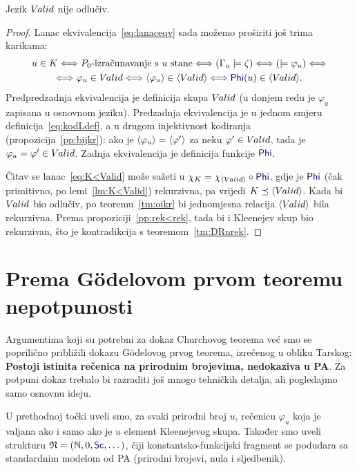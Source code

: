 \begin{propozicija}
Jezik $V\mspace{-1.5mu}alid$ nije odlučiv.
\end{propozicija}
\begin{proof}
Lanac ekvivalencija~\eqref{eq:lanaceqv} sada možemo proširiti još trima karikama:
\begin{multline}\label{eq:K<Valid}
    u\in K
    \Longleftrightarrow
    \text{$P_0$-izračunavanje s $u$ stane}
    \Longleftrightarrow
    (\Gamma_u\models\zeta)
    \Longleftrightarrow{}
    (\models\varphi_u)
    \Longleftrightarrow\\
    \Longleftrightarrow
    \varphi_u\in\Valid
    \Longleftrightarrow
    \kr{\varphi_u}\in\kr{\Valid}
    \Longleftrightarrow
    \f{Phi}(u)\in\kr{\Valid}
    \text.
\end{multline}
Predpredzadnja ekvivalencija je definicija skupa $V\mspace{-1.5mu}alid$ (u donjem redu je $\varphi_u$ zapisana u osnovnom jeziku). Predzadnja ekvivalencija je u jednom smjeru definicija~\eqref{eq:kodLdef}, a u drugom injektivnost kodiranja (propozicija~\ref{pp:bijkr}): ako je $\langle\varphi_u\rangle=\langle\varphi'\rangle$ za neku $\varphi'\in V\mspace{-1.5mu}alid$, tada je $\varphi_u=\varphi'\in V\mspace{-1.5mu}alid$. Zadnja ekvivalencija je definicija funkcije $\f{Phi}$.

	Čitav se lanac~\eqref{eq:K<Valid} može sažeti u $\chi_{K}=\chi_{\kr{\Valid}}\circ\f{Phi}$, gdje je $\f{Phi}$ (čak primitivno, po lemi~\ref{lm:K<Valid}) rekurzivna, pa vrijedi $K\preceq\langle V\mspace{-1.5mu}alid\rangle$.
Kada bi $V\mspace{-1.5mu}alid$ bio odlučiv, po teoremu~\ref{tm:oikr} bi jednomjesna relacija $\langle V\mspace{-1.5mu}alid\rangle$ bila rekurzivna. Prema propoziciji~\ref{pp:rek<rek}, tada bi i Kleenejev skup bio rekurzivan, što je kontradikcija s teoremom~\ref{tm:DRnrek}.
\end{proof}

\section{Prema Gödelovom prvom teoremu nepotpunosti}

Argumentima koji su potrebni za dokaz Churchovog teorema već smo se poprilično približili dokazu Gödelovog prvog teorema, izrečenog u obliku Tarskog: \textbf{Postoji istinita rečenica na prirodnim brojevima, nedokaziva u PA\@}. Za potpuni dokaz trebalo bi razraditi još mnogo tehničkih detalja, ali pogledajmo samo osnovnu ideju.

U prethodnoj točki uveli smo, za svaki prirodni broj $u$, rečenicu $\varphi_u$ koja je valjana ako i samo ako je $u$ element Kleenejevog skupa. Također smo uveli strukturu $\mathfrak N=(\N,0,\f{Sc},\dotsc)$, čiji konstantsko-funkcijski fragment se podudara sa standardnim modelom od PA (prirodni brojevi, nula i sljedbenik).

